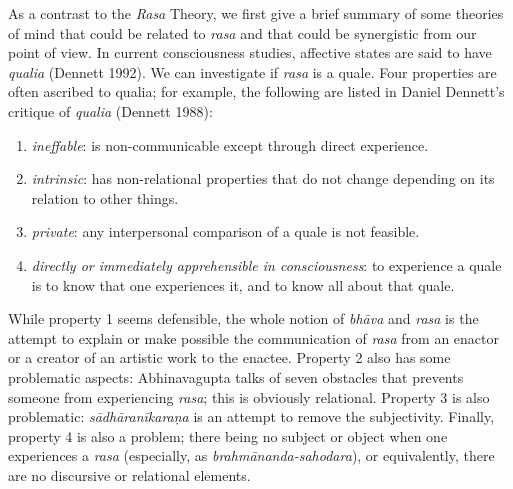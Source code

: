 As a contrast to the \textsl{Rasa} Theory, we first give a brief summary of some theories of mind that could be related to \textsl{rasa} and that could be synergistic from our point of view. In current consciousness studies, affective states are said to have \textsl{qualia} (Dennett 1992). We can investigate if \textsl{rasa} is a quale. Four properties are often ascribed to qualia; for example, the following are listed in Daniel Dennett's critique of \textsl{qualia} (Dennett 1988): 
\begin{enumerate}
\itemsep=0pt
\item \textsl{ineffable}: is non-communicable except through direct experi\-ence.
\item \textsl{intrinsic}: has non-relational properties that do not change depending on its relation to other things.
\item \textsl{private}: any interpersonal comparison of a quale is not feasible.
\item  \textsl{directly or immediately apprehensible in consciousness}: to experience a quale is to know that one experiences it, and to know all about that quale.
\end{enumerate}

While property 1 seems defensible, the whole notion of \textsl{bhāva} and \textsl{rasa} is the attempt to explain or make possible the communication of \textsl{rasa} from an enactor or a creator of an artistic work to the enactee. Property 2 also has some problematic aspects: Abhinavagupta talks of seven obstacles that prevents someone from experiencing \textsl{rasa}; this is obviously relational. Property 3 is also problematic: \textsl{sādhāranīkaraṇa} is an attempt to remove the subjectivity. Finally, property 4 is also a problem; there being no subject or object when one experiences a \textsl{rasa} (especially, as \textsl{brahmānanda-sahodara}), or equivalently, there are no discursive or relational elements.

